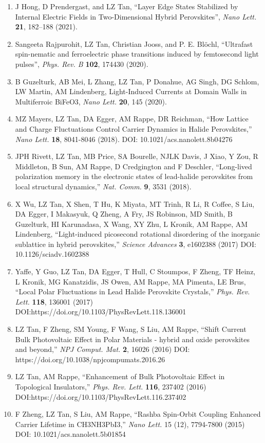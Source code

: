 \begin{enumerate}
    \item J Hong, D Prendergast, and LZ Tan, “Layer Edge States Stabilized by Internal Electric Fields in Two-Dimensional Hybrid Perovskites”, {\it Nano Lett.} {\bf 21}, 182–188 (2021).
    \item Sangeeta Rajpurohit, LZ Tan, Christian Jooss, and P. E. Blöchl, “Ultrafast spin-nematic and ferroelectric phase transitions induced by femtosecond light pulses”, {\it Phys. Rev. B} {\bf 102}, 174430 (2020).
    \item B Guzelturk, AB Mei, L Zhang, LZ Tan, P Donahue, AG Singh, DG Schlom, LW Martin, AM Lindenberg, Light-Induced Currents at Domain Walls in Multiferroic BiFeO3, {\it Nano Lett.} {\bf 20}, 145 (2020).
    \item MZ Mayers, LZ Tan, DA Egger, AM Rappe, DR Reichman, “How Lattice and Charge Fluctuations Control Carrier Dynamics in Halide Perovskites,” {\it Nano Lett.} {\bf 18}, 8041-8046 (2018). DOI: 10.1021/acs.nanolett.8b04276 
    \item JPH Rivett, LZ Tan, MB Price, SA Bourelle, NJLK Davis, J Xiao, Y Zou, R Middleton, B Sun, AM Rappe, D Credgington and F Deschler, “Long-lived polarization memory in the electronic states of lead-halide perovskites from local structural dynamics,” {\it Nat. Comm.} {\bf 9}, 3531 (2018).
    \item X Wu, LZ Tan, X Shen, T Hu, K Miyata, MT Trinh, R Li, R Coffee, S Liu, DA Egger, I Makasyuk, Q Zheng, A Fry, JS Robinson, MD Smith, B Guzelturk, HI Karunadasa, X Wang, XY Zhu, L Kronik, AM Rappe, AM Lindenberg, “Light-induced picosecond rotational disordering of the inorganic sublattice in hybrid perovskites,” {\it Science Advances} {\bf 3}, e1602388 (2017) DOI: 10.1126/sciadv.1602388
    \item Yaffe, Y Guo, LZ Tan, DA Egger, T Hull, C Stoumpos, F Zheng, TF Heinz, L Kronik, MG Kanatzidis, JS Owen, AM Rappe, MA Pimenta, LE Brus, “Local Polar Fluctuations in Lead Halide Perovskite Crystals,” {\it Phys. Rev. Lett.} {\bf 118}, 136001 (2017) DOI:https://doi.org/10.1103/PhysRevLett.118.136001
    \item LZ Tan, F Zheng, SM Young, F Wang, S Liu, AM Rappe, “Shift Current Bulk Photovoltaic Effect in Polar Materials - hybrid and oxide perovskites and beyond,” {\it NPJ Comput. Mat.} {\bf 2}, 16026 (2016) DOI: https://doi.org/10.1038/npjcompumats.2016.26
    \item LZ Tan, AM Rappe, “Enhancement of Bulk Photovoltaic Effect in Topological Insulators,” {\it Phys. Rev. Lett.} {\bf 116}, 237402 (2016) DOI:https://doi.org/10.1103/PhysRevLett.116.237402
    \item F Zheng, LZ Tan, S Liu, AM Rappe, “Rashba Spin-Orbit Coupling Enhanced Carrier Lifetime in CH3NH3PbI3,” {\it Nano Lett.} 15 (12), 7794-7800 (2015) DOI: 10.1021/acs.nanolett.5b01854
\end{enumerate}

